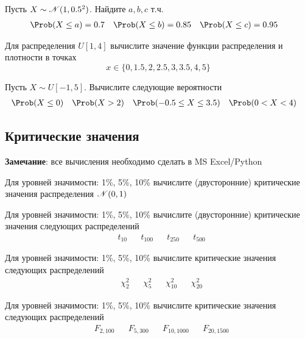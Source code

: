 \begin{exercise}
Пусть \(X\sim{\mathscr N}(1,0.5^2)\). Найдите \(a,b,c\) т.ч.
\begin{align*}
	&\Prob(X\leq a)=0.7 & &\Prob(X\leq b)=0.85 & 
	&\Prob(X\leq c)=0.95
\end{align*}
\end{exercise}

\begin{exercise}
Для распределения \(U[1, 4]\) 
вычислите значение функции распределения и плотности в точках
\[
	x\in\{0, 1.5, 2, 2.5, 3, 3.5, 4, 5\}
\]
\end{exercise}

\begin{exercise}
Пусть \(X\sim U[-1, 5]\). Вычислите следующие вероятности
\begin{align*}
	&\Prob(X\leq0) & &\Prob(X>2) & 
	&\Prob(-0.5\leq X\leq3.5) & &\Prob(0<X<4)
\end{align*}
\end{exercise}

\subsection{Критические значения}

\textbf{Замечание}: все вычисления необходимо сделать в MS Excel/Python

\begin{exercise}
Для уровней значимости: 1\%, 5\%, 10\% вычислите (двусторонние) 
критические значения распределения \({\mathscr N}(0,1)\)
\end{exercise}

\begin{exercise}
Для уровней значимости: 1\%, 5\%, 10\% вычислите (двусторонние) 
критические значения следующих распределений
\begin{align*}
	&t_{10} & &t_{100} & &t_{250} & &t_{500}
\end{align*}
\end{exercise}

\begin{exercise}
Для уровней значимости: 1\%, 5\%, 10\% вычислите
критические значения следующих распределений
\begin{align*}
	&\chi^2_{2} & &\chi^2_{5} & &\chi^2_{10} & &\chi^2_{20}
\end{align*}
\end{exercise}

\begin{exercise}
Для уровней значимости: 1\%, 5\%, 10\% вычислите
критические значения следующих распределений
\begin{align*}
	&F_{2,100} & &F_{5, 300} & &F_{10, 1000} & &F_{20, 1500}
\end{align*}
\end{exercise}